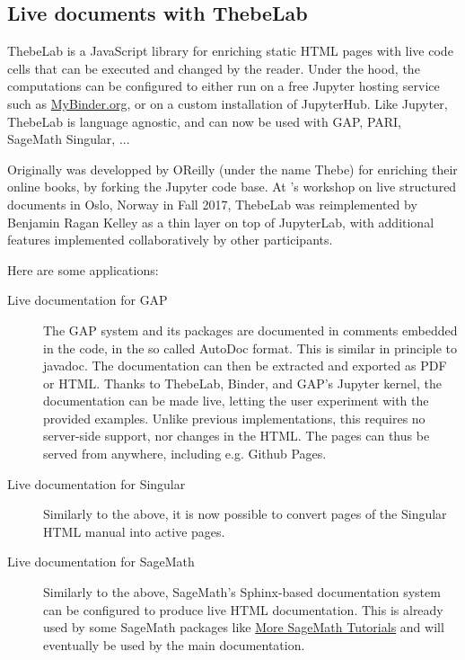 \documentclass{deliverablereport}
\begin{document}
\subsection{Live documents with ThebeLab}

ThebeLab is a JavaScript library for enriching static HTML pages with live code cells
that can be executed and changed by the reader.
Under the hood, the computations can be configured to either run on a free Jupyter hosting service
such as \url{MyBinder.org}, or on a custom installation of JupyterHub. Like Jupyter, ThebeLab
is language agnostic, and can now be used with GAP, PARI, SageMath Singular, ...

Originally was developped by OReilly (under the name Thebe) for enriching their online books, by forking the Jupyter code base.
At \ODK's workshop on live structured documents in Oslo, Norway in Fall 2017, ThebeLab was
reimplemented by Benjamin Ragan Kelley as a thin layer on top of JupyterLab, with additional
features implemented collaboratively by other participants.

Here are some applications:
\begin{description}
\item[Live documentation for GAP] The GAP system and its packages are documented
in comments embedded in the code, in the so called AutoDoc format.
This is similar in principle to javadoc.
The documentation can then be extracted and exported as PDF or HTML.
Thanks to ThebeLab, Binder, and GAP's Jupyter kernel, the documentation can be made live,
letting the user experiment with the provided examples.
Unlike previous implementations, this requires no server-side support, nor changes in the HTML.
The pages can thus be served from anywhere, including e.g. Github Pages.

\item[Live documentation for Singular] Similarly to the above, it is now possible to convert pages of the Singular
HTML manual into active pages. %

\item[Live documentation for SageMath] Similarly to the above, SageMath's Sphinx-based documentation system
can be configured to produce live HTML documentation.
This is already used by some SageMath packages like
\href{http://more-sagemath-tutorials.readthedocs.io/}{More SageMath Tutorials}
and will eventually be used by the main \Sage documentation.
\end{description}
\end{document}
